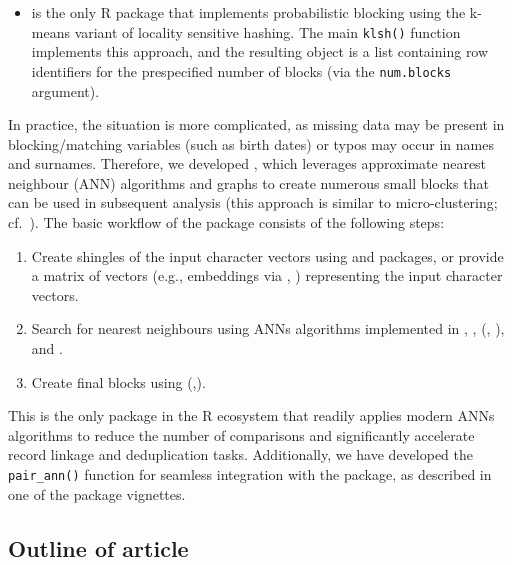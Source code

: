 \begin{itemize}
  \begin{itemize}
  \tightlist
  \item
     \citep{klsh} is the only R package that implements
    probabilistic blocking using the k-means variant of locality
    sensitive hashing. The main \texttt{klsh()} function implements this
    approach, and the resulting object is a list containing row
    identifiers for the prespecified number of blocks (via the
    \texttt{num.blocks} argument).
  \end{itemize}
\end{itemize}

In practice, the situation is more complicated, as missing data may be
present in blocking/matching variables (such as birth dates) or typos
may occur in names and surnames. Therefore, we developed
, which leverages approximate nearest neighbour (ANN)
algorithms and graphs to create numerous small blocks that can be used
in subsequent analysis (this approach is similar to micro-clustering;
cf.~\citet{johndrow2018theoretical}). The basic workflow of the
 package consists of the following steps:

\begin{enumerate}
\def\labelenumi{\arabic{enumi}.}
\tightlist
\item
  Create shingles of the input character vectors using
   \citep{tokenizers} and 
  \citep{text2vec} packages, or provide a matrix of vectors (e.g.,
  embeddings via , \citet{ragnar}) representing the input
  character vectors.
\item
  Search for nearest neighbours using ANNs algorithms implemented in
   \citep{rnndescent},  \citep{RcppHNSW},
   (\citet{mlpack2023}, \citet{mlpack2025}), and 
  \citep{RcppAnnoy}.
\item
  Create final blocks using  (\citet{igraph2025},\citet{igraph2006}).
\end{enumerate}

This is the only package in the R ecosystem that readily applies modern
ANNs algorithms to reduce the number of comparisons and significantly
accelerate record linkage and deduplication tasks. Additionally, we have
developed the \texttt{pair\_ann()} function for seamless integration with the
 package, as described in one of the package vignettes.

\subsection{Outline of article}\label{outline-of-article}

